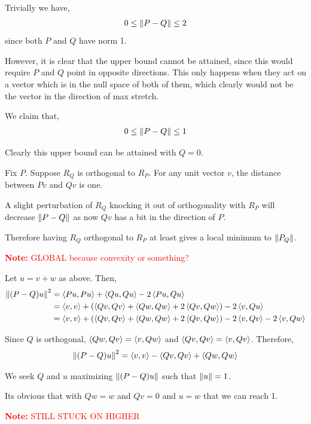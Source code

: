 \documentclass[10pt]{article}
\newcommand{\note}[1]{\textcolor{red}{\textbf{Note:} #1}}
\begin{document}
\begin{solution}[Solution]

Trivially we have,
\begin{align*}
    0 \leq \left\lVert P-Q\right\rVert \leq 2
\end{align*}
since both \( P \) and \( Q \) have norm 1.

However, it is clear that the upper bound cannot be attained, since this would require \( P \) and \( Q \) point in opposite directions. This only happens when they act on a vector which is in the null space of both of them, which clearly would not be the vector in the direction of max stretch.

We claim that,
\begin{align*}
    0\leq \left\lVert P-Q\right\rVert\leq 1
\end{align*}

Clearly this upper bound can be attained with \( Q = 0 \).

Fix \( P \). Suppose \( R_Q \) is orthogonal to \( R_P \).
For any unit vector \( v \), the distance between \( Pv \) and \( Qv \) is one.
    
A slight perturbation of \( R_Q \) knocking it out of orthogonality with \( R_P \) will decrease \( \left\lVert P-Q\right\rVert \) as now \( Qv \) has a bit in the direction of \( P \).

Therefore having \( R_Q \) orthogonal to \( R_P \) at least gives a local minimum to \( \left\lVert P_Q\right\rVert \). 

\note{GLOBAL because convexity or something?}

Let \( u=v+w \) as above. Then,
\begin{align*}
    \left\lVert(P-Q)u\right\rVert^2 &= \left\langle Pu,Pu \right\rangle + \left\langle Qu,Qu \right\rangle - 2\left\langle Pu,Qu \right\rangle
    \\&= \left\langle v,v \right\rangle + (\left\langle Qv,Qv \right\rangle + \left\langle Qw,Qw \right\rangle + 2\left\langle Qv,Qw \right\rangle) - 2\left\langle v,Q u \right\rangle
    \\&= \left\langle v,v \right\rangle + (\left\langle Qv,Qv \right\rangle + \left\langle Qw,Qw \right\rangle + 2\left\langle Qv,Qw \right\rangle) - 2\left\langle v,Q v \right\rangle - 2\left\langle v,Qw \right\rangle
\end{align*}

Since \( Q \) is orthogonal, \( \left\langle Qw,Qv \right\rangle = \left\langle v,Qw \right\rangle \) and \( \left\langle Qv,Qv \right\rangle = \left\langle v,Qv \right\rangle \). Therefore,
\begin{align*}
    \left\lVert(P-Q)u\right\rVert^2 = \left\langle v,v \right\rangle - \left\langle Qv,Qv \right\rangle + \left\langle Qw,Qw \right\rangle
\end{align*}

    We seek \( Q \) and \( u \) maximizing \( \left\lVert(P-Q)u\right\rVert \) such that \( \left\lVert u\right\rVert=1 \).

Its obvious that with \( Qw=w \) and \( Qv = 0 \) and \( u=w \) that we can reach 1.

\note{STILL STUCK ON HIGHER}


    
\end{solution}
\end{document}
